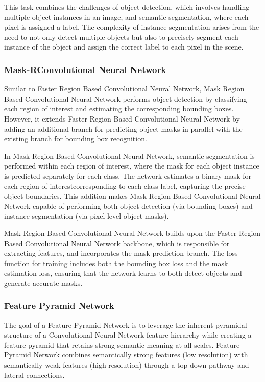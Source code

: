 This task combines the challenges of object detection, which involves handling multiple object instances in an image, and semantic segmentation, where each pixel is assigned a label. 
The complexity of instance segmentation arises from the need to not only detect multiple objects but also to precisely segment each instance of the object and assign the correct label to each pixel in the scene.

\subsubsection{Mask-RConvolutional Neural Network} 
Similar to Faster Region Based Convolutional Neural Network, Mask Region Based Convolutional Neural Network performs object detection by classifying each region of interest and estimating the corresponding bounding boxes. 
However, it extends Faster Region Based Convolutional Neural Network by adding an additional branch for predicting object masks in parallel with the existing branch for bounding box recognition. 

In Mask Region Based Convolutional Neural Network, semantic segmentation is performed within each region of interest, where the mask for each object instance is predicted separately for each class. 
The network estimates a binary mask for each region of interestcorresponding to each class label, capturing the precise object boundaries. 
This addition makes Mask Region Based Convolutional Neural Network capable of performing both object detection (via bounding boxes) and instance segmentation (via pixel-level object masks).

Mask Region Based Convolutional Neural Network builds upon the Faster Region Based Convolutional Neural Network backbone, which is responsible for extracting features, and incorporates the mask prediction branch. 
The loss function for training includes both the bounding box loss and the mask estimation loss, ensuring that the network learns to both detect objects and generate accurate masks.

\subsubsection{Feature Pyramid Network}
The goal of a Feature Pyramid Network is to leverage the inherent pyramidal structure of a Convolutional Neural Network feature hierarchy while creating a feature pyramid that retains strong semantic meaning at all scales. 
Feature Pyramid Network combines semantically strong features (low resolution) with semantically weak features (high resolution) through a top-down pathway and lateral connections.

